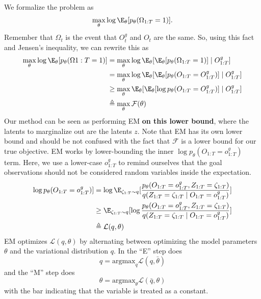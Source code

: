 We formalize the problem as
\begin{align}
\max_\theta \log \E_\theta [ p_\theta(\Omega_{1:T}=1)] . 
\end{align}
Remember that $\Omega_t$ is the event that $O_t^g$ and $O_t$ are the same.
So, using this fact and Jensen's inequality, we can rewrite this as
\begin{align}
\max_\theta \log \E_\theta [ p_\theta(\Omega{1:T}=1)]
&= \max_\theta \log \E_\theta [ \E_\theta [ p_\theta(\Omega_{1:T}=1) ] \mid O_{1:T}^g]
\\&=\max_\theta \log \E_\theta [ \E_\theta [ p_\theta(O_{1:T} = O_{1:T}^g)] \mid O_{1:T}^g]
\\&\geq\max_\theta \E_\theta [ \E_\theta [ \log p_\theta(O_{1:T} = O_{1:T}^g)] \mid O_{1:T}^g]
\\&\triangleq \max_\theta \mathcal{F}(\theta)
\end{align}
Our method can be seen as performing EM \textbf{on this lower bound}, where the latents to marginalize out are the latents $z$.
Note that EM has its own lower bound and should be not confused with the fact that $\mathcal F$ is a lower bound for our true objective.
EM works by lower-bounding the inner $\log p_\theta(O_{1:T} = o_{1:T}^g)$ term.
Here, we use a lower-case $o_{1:T}^g$ to remind ourselves that the goal observations should not be considered random variables inside the expectation.
\begin{align}
\log p_\theta(O_{1:T} = o_{1:T}^g)]
&= \log \E_{\zeta_{1:T} \sim q}[
    \frac{
        p_\theta(O_{1:T} = o_{1:T}^g, Z_{1:T}=\zeta_{1:T})
    }{
        q(Z_{1:T} = \zeta_{1:T} \mid O_{1:T} = o_{1:T}^g)
    }
]
\\
&\geq \E_{\zeta_{1:T} \sim q}[ \log
    \frac{
        p_\theta(O_{1:T} = o_{1:T}^g, Z_{1:T}=\zeta_{1:T})
    }{
        q(Z_{1:T} = \zeta_{1:T} \mid O_{1:T} = o_{1:T}^g)
    }
]
\\
&\triangleq \mathcal L(q, \theta)
\end{align}
EM optimizes $\mathcal L(q, \theta)$ by alternating between optimizing the model parameters $\theta$ and the variational distribution $q$.
In the ``E'' step does
\[
    q = \text{argmax}_q \mathcal L(q, \bar \theta)
\]
and the ``M'' step does
\[
    \theta = \text{argmax}_\theta \mathcal L(\bar q, \theta)
\]
with the bar indicating that the variable is treated as a constant.
